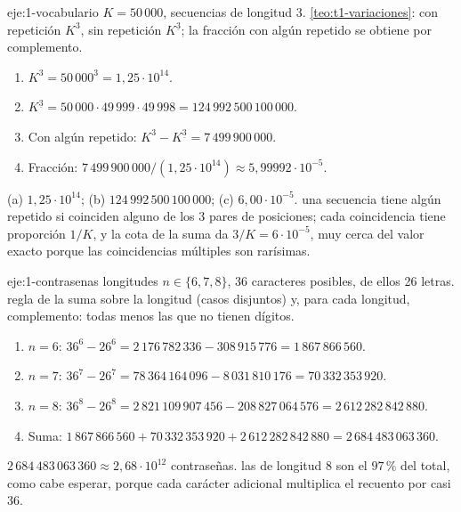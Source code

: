 \begin{solucion}{eje:1-vocabulario}
\datos $K=50\,000$, secuencias de longitud 3.
\planteamiento \cref{teo:t1-variaciones}: con repetición $K^{3}$, sin repetición $K^{\underline 3}$; la fracción con algún repetido se obtiene por complemento.
\pasos
\begin{enumerate}[label=\arabic*.]
  \item $K^{3}=50\,000^{3}=1{,}25\cdot10^{14}$.
  \item $K^{\underline3}=50\,000\cdot49\,999\cdot49\,998=124\,992\,500\,100\,000$.
  \item Con algún repetido: $K^{3}-K^{\underline3}=7\,499\,900\,000$.
  \item Fracción: $7\,499\,900\,000/(1{,}25\cdot10^{14})\approx5{,}99992\cdot10^{-5}$.
\end{enumerate}
\resultado (a) $1{,}25\cdot10^{14}$; (b) $124\,992\,500\,100\,000$; (c) $6{,}00\cdot10^{-5}$.
\comprobacion una secuencia tiene algún repetido si coinciden alguno de los 3 pares de posiciones; cada coincidencia tiene proporción $1/K$, y la cota de la suma da $3/K=6\cdot10^{-5}$, muy cerca del valor exacto porque las coincidencias múltiples son rarísimas.
\end{solucion}

\begin{solucion}{eje:1-contrasenas}
\datos longitudes $n\in\{6,7,8\}$, 36 caracteres posibles, de ellos 26 letras.
\planteamiento regla de la suma sobre la longitud (casos disjuntos) y, para cada longitud, complemento: todas menos las que no tienen dígitos.
\pasos
\begin{enumerate}[label=\arabic*.]
  \item $n=6$: $36^{6}-26^{6}=2\,176\,782\,336-308\,915\,776=1\,867\,866\,560$.
  \item $n=7$: $36^{7}-26^{7}=78\,364\,164\,096-8\,031\,810\,176=70\,332\,353\,920$.
  \item $n=8$: $36^{8}-26^{8}=2\,821\,109\,907\,456-208\,827\,064\,576=2\,612\,282\,842\,880$.
  \item Suma: $1\,867\,866\,560+70\,332\,353\,920+2\,612\,282\,842\,880=2\,684\,483\,063\,360$.
\end{enumerate}
\resultado $2\,684\,483\,063\,360\approx2{,}68\cdot10^{12}$ contraseñas.
\comprobacion las de longitud 8 son el $97\,\%$ del total, como cabe esperar, porque cada carácter adicional multiplica el recuento por casi 36.
\end{solucion}

